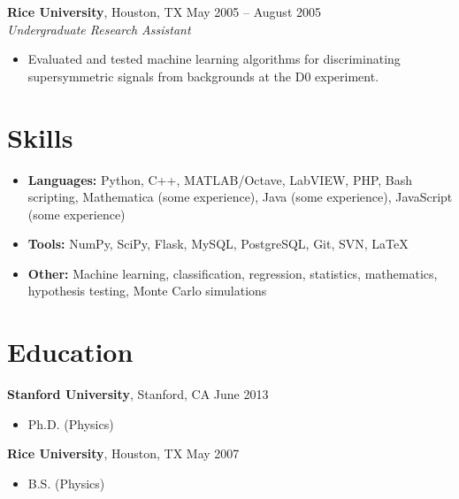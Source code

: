\documentclass[margin,line]{resume}
\begin{document}
\begin{resume}
    \textbf{Rice University}, Houston, TX \hfill May 2005 -- August 2005 \vspace{1mm}\\\vspace{1mm}%
    \textsl{Undergraduate Research Assistant}
    \begin{itemize}
    \item Evaluated and tested machine learning algorithms for discriminating supersymmetric signals from backgrounds at the D0 experiment.
    \end{itemize}
    
    \section{\mysidestyle Skills}\vspace{0mm}%
    \begin{itemize}
    \item \textbf{Languages:} Python, C++, MATLAB/Octave, LabVIEW, PHP, Bash scripting, Mathematica (some experience), Java (some experience), JavaScript (some experience)
    \item \textbf{Tools:} NumPy, SciPy, Flask, MySQL, PostgreSQL, Git, SVN, \LaTeX
    \item \textbf{Other:} Machine learning, classification, regression, statistics, mathematics, hypothesis testing, Monte Carlo simulations
    \end{itemize}
    
    \section{\mysidestyle Education}

    \textbf{Stanford University}, Stanford, CA \hfill June 2013\vspace{-3mm}\\\vspace{-1mm}%
    \begin{itemize}
    \item Ph.D. (Physics)
    \end{itemize}\vspace{-1.5mm}
    
    \textbf{Rice University}, Houston, TX \hfill May 2007\vspace{-3mm}\\\vspace{-1mm}%
    \begin{itemize}
    \item B.S. (Physics)
    \end{itemize}\vspace{-1.5mm}
 

\end{resume}
\end{document}
